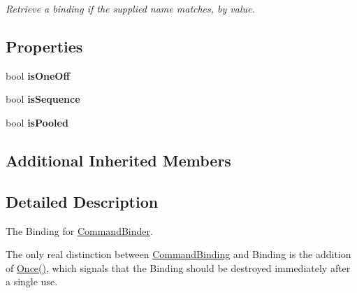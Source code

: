 \begin{DoxyCompactItemize}
\begin{DoxyCompactList}\small\item\em Retrieve a binding if the supplied name matches, by value. \end{DoxyCompactList}\end{DoxyCompactItemize}
\subsection*{Properties}
\begin{DoxyCompactItemize}
\item 
\hypertarget{classstrange_1_1extensions_1_1command_1_1impl_1_1_command_binding_a310f0164dcd9324688d1e0000174dcaa}{bool {\bfseries is\-One\-Off}}\label{classstrange_1_1extensions_1_1command_1_1impl_1_1_command_binding_a310f0164dcd9324688d1e0000174dcaa}

\item 
\hypertarget{classstrange_1_1extensions_1_1command_1_1impl_1_1_command_binding_ab2a00dd6d304cd3a92588aeecf9b7097}{bool {\bfseries is\-Sequence}}\label{classstrange_1_1extensions_1_1command_1_1impl_1_1_command_binding_ab2a00dd6d304cd3a92588aeecf9b7097}

\item 
\hypertarget{classstrange_1_1extensions_1_1command_1_1impl_1_1_command_binding_a25dde0d5aed354bb834c0ef9e83ae127}{bool {\bfseries is\-Pooled}}\label{classstrange_1_1extensions_1_1command_1_1impl_1_1_command_binding_a25dde0d5aed354bb834c0ef9e83ae127}

\end{DoxyCompactItemize}
\subsection*{Additional Inherited Members}


\subsection{Detailed Description}
The Binding for \hyperlink{classstrange_1_1extensions_1_1command_1_1impl_1_1_command_binder}{Command\-Binder}. 

The only real distinction between \hyperlink{classstrange_1_1extensions_1_1command_1_1impl_1_1_command_binding}{Command\-Binding} and Binding is the addition of {\ttfamily \hyperlink{classstrange_1_1extensions_1_1command_1_1impl_1_1_command_binding_a8e9748be1b68811006095c2b91b226f6}{Once()}}, which signals that the Binding should be destroyed immediately after a single use. 


